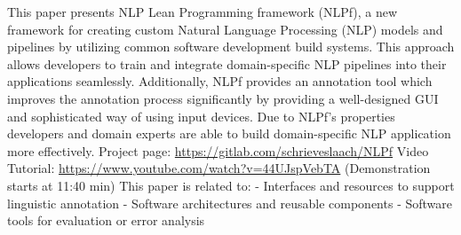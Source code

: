 This paper presents NLP Lean Programming framework (NLPf), a new framework for creating custom Natural Language Processing (NLP) models and pipelines by utilizing common software development build systems. This approach allows developers to train and integrate domain-specific NLP pipelines into their applications seamlessly. Additionally, NLPf provides an annotation tool which improves the annotation process significantly by providing a well-designed GUI and sophisticated way of using input devices. Due to NLPf's properties developers and domain experts are able to build domain-specific NLP application more effectively. Project page:   \url{https://gitlab.com/schrieveslaach/NLPf} Video Tutorial: \url{https://www.youtube.com/watch?v=44UJspVebTA} (Demonstration starts at 11:40 min) This paper is related to: - Interfaces and resources to support linguistic annotation - Software architectures and reusable components - Software tools for evaluation or error analysis

